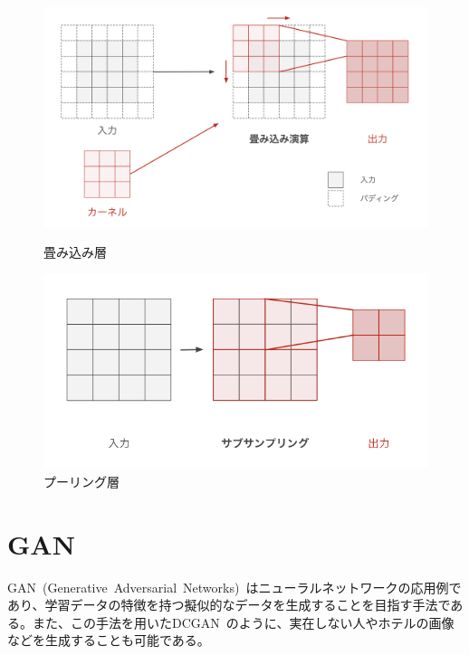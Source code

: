 \begin{figure}[b]
\centering
\begin{minipage}[b]{0.48\columnwidth}
\centering
\includegraphics[width=0.9\columnwidth]{figure/convolution.png}
\caption[CNNの畳み込み層]{畳み込み層}
\label{fig:conv}
\end{minipage}
\begin{minipage}[b]{0.48\columnwidth}
\centering
\includegraphics[width=\columnwidth]{figure/pooling.png}
\caption[CNNのプーリング層]{プーリング層}
\label{fig:pooling}
\end{minipage}
\end{figure}

\clearpage

\section{GAN}

GAN~(Generative~Adversarial~Networks)~\cite{GAN}はニューラルネットワークの応用例であり、学習データの特徴を持つ擬似的なデータを生成することを目指す手法である。また、この手法を用いたDCGAN~\cite{DCGAN}のように、実在しない人やホテルの画像などを生成することも可能である。

